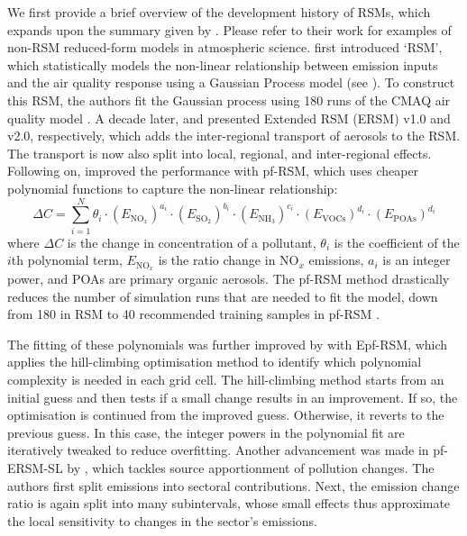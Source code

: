 We first provide a brief overview of the development history of RSMs, which expands upon the summary given by \textcite{emission-rsm-2022}. Please refer to their work for examples of non-RSM reduced-form models in atmospheric science. \textcite{rsm-epa-2006} first introduced `RSM', which statistically models the non-linear relationship between emission inputs and the air quality response using a Gaussian Process model (see ). To construct this RSM, the authors fit the Gaussian process using 180 runs of the CMAQ air quality model \cite{cmaq-2006}. A decade later, \textcite{ersm-v1-2015} and \textcite{ersm-v2-2017} presented Extended RSM (ERSM) v1.0 and v2.0, respectively, which adds the inter-regional transport of aerosols to the RSM. The transport is now also split into local, regional, and inter-regional effects. Following on, \textcite{pf-rsm-2018} improved the performance with pf-RSM, which uses cheaper polynomial functions to capture the non-linear relationship:
\begin{equation*}
    \Delta C = \sum_{i=1}^{N} \theta_i \cdot (E_{\text{NO}_{x}})^{a_i} \cdot (E_{\text{SO}_2})^{b_i} \cdot (E_{\text{NH}_3})^{c_i} \cdot (E_{\text{VOCs}})^{d_i} \cdot (E_{\text{POAs}})^{d_i}
\end{equation*}
where $\Delta C$ is the change in concentration of a pollutant, $\theta_i$ is the coefficient of the $i$th polynomial term, $E_{\text{NO}_{x}}$ is the ratio change in $\text{NO}_{x}$ emissions, $a_i$ is an integer power, and POAs are primary organic aerosols. The pf-RSM method drastically reduces the number of simulation runs that are needed to fit the model, down from 180 in RSM \cite{rsm-epa-2006} to 40 recommended training samples in pf-RSM \cite{pf-rsm-2018}.

The fitting of these polynomials was further improved by \textcite{epf-rsm-2020} with Epf-RSM, which applies the hill-climbing optimisation method \cite{hill-climbing-2004} to identify which polynomial complexity is needed in each grid cell. The hill-climbing method starts from an initial guess and then tests if a small change results in an improvement. If so, the optimisation is continued from the improved guess. Otherwise, it reverts to the previous guess. In this case, the integer powers in the polynomial fit are iteratively tweaked to reduce overfitting. Another advancement was made in pf-ERSM-SL by \textcite{pf-ersm-sl-2020}, which tackles source apportionment of pollution changes. The authors first split emissions into sectoral contributions. Next, the emission change ratio is again split into many subintervals, whose small effects thus approximate the local sensitivity to changes in the sector's emissions.

